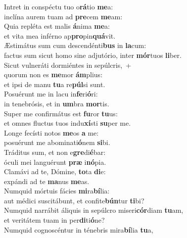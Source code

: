 \evenverse Intret in conspéctu tuo o\textbf{rá}tio \textbf{me}a:~\*\\
\evenverse inclína aurem tuam ad \textbf{pre}cem \textbf{me}am:\\
\oddverse Quia repléta est malis \textbf{á}nima \textbf{me}a:~\*\\
\oddverse et vita mea inférno ap\textbf{pro}pin\textbf{quá}vit.\\
\evenverse Æstimátus sum cum descendénti\textbf{bus} in \textbf{la}cum:~\*\\
\evenverse factus sum sicut homo sine adjutório, inter \textbf{mór}tuos \textbf{li}ber.\\
\oddverse Sicut vulneráti dormiéntes in sepúlcris,~+\\
\oddverse  quorum non es \textbf{me}mor \textbf{ám}plius:~\*\\
\oddverse et ipsi de manu \textbf{tu}a re\textbf{púl}si sunt.\\
\evenverse Posuérunt me in lacu in\textbf{fe}ri\textbf{ó}ri:~\*\\
\evenverse in tenebrósis, et in \textbf{um}bra \textbf{mor}tis.\\
\oddverse Super me confirmátus est \textbf{fu}ror \textbf{tu}us:~\*\\
\oddverse et omnes fluctus tuos indu\textbf{xí}sti \textbf{su}per me.\\
\evenverse Longe fecísti notos \textbf{me}os \textbf{a} me:~\*\\
\evenverse posuérunt me abominati\textbf{ó}nem \textbf{si}bi.\\
\oddverse Tráditus sum, et non e\textbf{gre}di\textbf{é}bar:~\*\\
\oddverse óculi mei languérunt \textbf{præ} i\textbf{nó}pia.\\
\evenverse Clamávi ad te, Dómine, \textbf{to}ta \textbf{di}e:~\*\\
\evenverse expándi ad te \textbf{ma}nus \textbf{me}as.\\
\oddverse Numquid mórtuis fácies \textbf{mi}ra\textbf{bí}lia:~\*\\
\oddverse aut médici suscitábunt, et confite\textbf{bún}tur \textbf{ti}bi?\\
\evenverse Numquid narrábit áliquis in sepúlcro miseri\textbf{cór}diam \textbf{tu}am,~\*\\
\evenverse et veritátem tuam in per\textbf{di}ti\textbf{ó}ne?\\
\oddverse Numquid cognoscéntur in ténebris mira\textbf{bí}lia \textbf{tu}a,~\*\\
